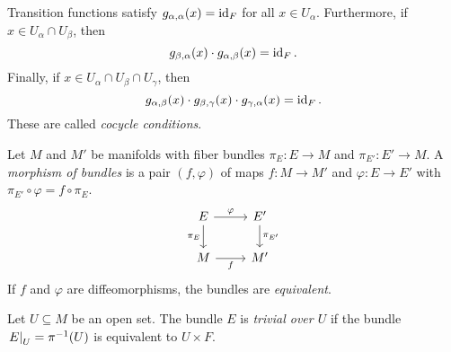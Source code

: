 \begin{opomba}
Transition functions satisfy $g_{\alpha, \alpha}(x) = \operatorname{id}_F$ for
all $x \in U_\alpha$. Furthermore, if
$x \in U_\alpha \cap U_\beta$, then
\[
g_{\beta, \alpha}(x) \cdot g_{\alpha, \beta}(x) = \operatorname{id}_F.
\]
Finally, if $x \in U_\alpha \cap U_\beta \cap U_\gamma$, then
\[
g_{\alpha, \beta}(x) \cdot g_{\beta, \gamma}(x) \cdot
g_{\gamma, \alpha}(x) =
\operatorname{id}_F.
\]
These are called
\emph{cocycle conditions}.
\end{opomba}

\begin{definicija}
Let $M$ and $M'$ be manifolds with fiber bundles
$\pi_E \colon E \to M$ and $\pi_{E'} \colon E' \to M$. A
\emph{morphism of bundles} is a pair
$(f, \varphi)$ of maps $f \colon M \to M'$ and
$\varphi \colon E \to E'$ with
$\pi_{E'} \circ \varphi = f \circ \pi_E$.
\[
\begin{tikzcd}
E \arrow[r, "\varphi"] \arrow[d, "\pi_E"'] &
E' \arrow[d, "\pi_{E'}"] \\
M \arrow[r, "f"'] &
M'
\end{tikzcd}
\]
If $f$ and $\varphi$ are diffeomorphisms, the bundles are
\emph{equivalent}.
\end{definicija}

\begin{definicija}
Let $U \subseteq M$ be an open set. The bundle $E$ is
\emph{trivial over $U$} if the bundle
$\left. E\right|_{U}^{} = \pi^{-1}(U)$ is equivalent to $U \times F$.
\end{definicija}

